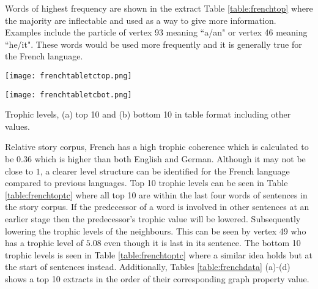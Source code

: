 Words of highest frequency are shown in the extract Table \ref{table:frenchtop} where the majority are inflectable and used as a way to give more information. Examples include the particle of vertex 93 meaning ``a/an" or vertex 46 meaning ``he/it". These words would be used more frequently and it is generally true for the French language.

\begin{table}[!htb]
\centering
\begin{subtable}{.45\textwidth}
	\centering
	\texttt{[image: frenchtabletctop.png]}
	\caption{}
	\label{table:frenchtoptc}
\end{subtable}
\hfill
\begin{subtable}{.45\textwidth}
	\centering
	\texttt{[image: frenchtabletcbot.png]}
	\caption{}
	\label{table:frenchbottc}
\end{subtable}
\caption{Trophic levels, (a) top 10 and (b) bottom 10 in table format including other values.}
\end{table}

Relative story corpus, French has a high trophic coherence which is calculated to be $0.36$ which is higher than both English and German. Although it may not be close to $1$, a clearer level structure can be identified for the French language compared to previous languages. Top 10 trophic levels can be seen in Table \ref{table:frenchtoptc} where all top 10 are within the last four words of sentences in the story corpus. If the predecessor of a word is involved in other sentences at an earlier stage then the predecessor's trophic value will be lowered. Subsequently lowering the trophic levels of the neighbours. This can be seen by vertex 49 who has a trophic level of $5.08$ even though it is last in its sentence. The bottom 10 trophic levels is seen in Table \ref{table:frenchtoptc} where a similar idea holds but at the start of sentences instead. Additionally, Tables \ref{table:frenchdata} (a)-(d) shows a top 10 extracts in the order of their corresponding graph property value.

